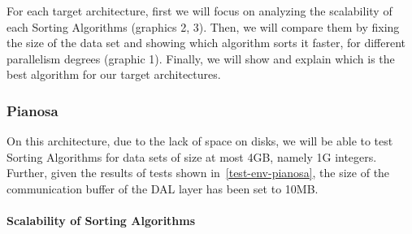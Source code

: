 For each target architecture, first we will focus on analyzing the scalability of each Sorting Algorithms (graphics 2, 3). Then, we will compare them by fixing the size of the data set and showing which algorithm sorts it faster, for different parallelism degrees (graphic 1). Finally, we will show and explain which is the best algorithm for our target architectures. 

\subsubsection{Pianosa}
On this architecture, due to the lack of space on disks, we will be able to test Sorting Algorithms for data sets of size at most 4GB, namely 1G integers. Further, given the results of tests shown in~\ref{test-env-pianosa}, the size of the communication buffer of the DAL layer has been set to 10MB. 

\paragraph{Scalability of Sorting Algorithms}

